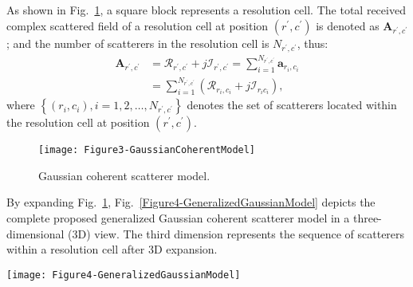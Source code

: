 \documentclass[journal]{IEEEtran}
\begin{document}
As shown in Fig.~\ref{Figure3-GaussianCoherentModel}, a square block represents a resolution cell.
The total received complex scattered field of a resolution cell at position $(r^{\prime},c^{\prime})$
is denoted as $\boldsymbol{A}_{r^{\prime},c^{\prime}}$; and the number of scatterers in the resolution cell is $N_{r^{\prime},c^{\prime} }$, thus:
\begin{align}
\boldsymbol{A}_{r^{\prime}, c^{\prime}} & =\mathcal{R}_{r^{\prime}, c^{\prime}}+j \mathcal{I}_{r^{\prime}, c^{\prime}}=\sum_{i=1}^{N_{r^{\prime}, c^{\prime}}} \boldsymbol{a}_{r_{i}, c_{i}}\nonumber \\
& =\sum_{i=1}^{N_{r^{\prime}, c^{\prime}}}\left(\mathcal{R}_{r_{i}, c_{i}}+j \mathcal{I}_{r_{i} c_{i}}\right),
\label{eq4}
\end{align}
where $\left\{\left(r_{i}, c_{i}\right), i=1,2, \dots, N_{r^{\prime}, c^{\prime}}\right\}$ denotes the set of scatterers located within the resolution cell at position $(r^{\prime},c^{\prime})$.

\begin{figure}[hbt]
\centering
\texttt{[image: Figure3-GaussianCoherentModel]}
\caption{Gaussian coherent scatterer model.}
\label{Figure3-GaussianCoherentModel}
\end{figure}

By expanding Fig.~\ref{Figure3-GaussianCoherentModel},
Fig.~\ref{Figure4-GeneralizedGaussianModel} depicts the complete proposed generalized Gaussian coherent scatterer model in a three-dimensional (3D) view. The third dimension represents the sequence of scatterers within a resolution cell after 3D expansion.

\begin{figure*}
\centering
\texttt{[image: Figure4-GeneralizedGaussianModel]}  \caption{Generalized Gaussian coherent scatterer model}
\label{Figure4-GeneralizedGaussianModel}
\end{figure*}
\end{document}

